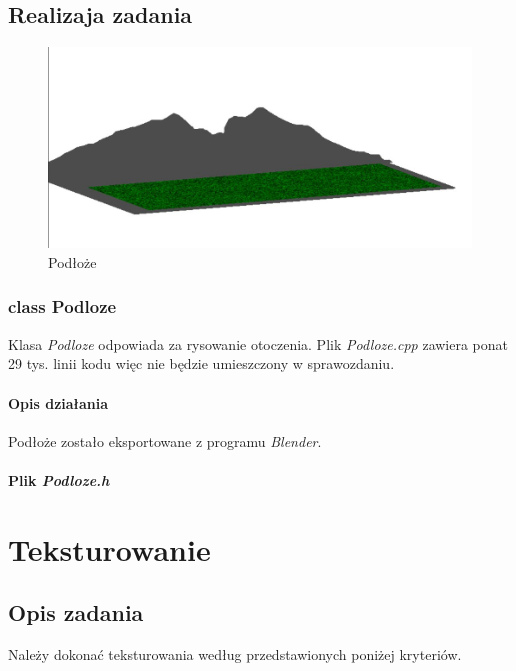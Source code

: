 \documentclass[a4paper, 12pt]{report}
\begin{document}
\section{Realizaja zadania}

\begin{figure}
		\centering
		\includegraphics[scale=0.4]{podloze.jpg}
		\caption{Podłoże}
\end{figure}

\subsection{class Podloze}

Klasa \emph{Podloze} odpowiada za rysowanie otoczenia. Plik \emph{Podloze.cpp} zawiera ponat 29 tys. linii kodu więc nie będzie umieszczony w sprawozdaniu.

\subsubsection{Opis działania}

Podłoże zostało eksportowane z programu \emph{Blender}.

\subsubsection{Plik \emph{Podloze.h}}



\chapter{Teksturowanie}
\section{Opis zadania}

Należy dokonać teksturowania według przedstawionych poniżej kryteriów.
\end{document}
